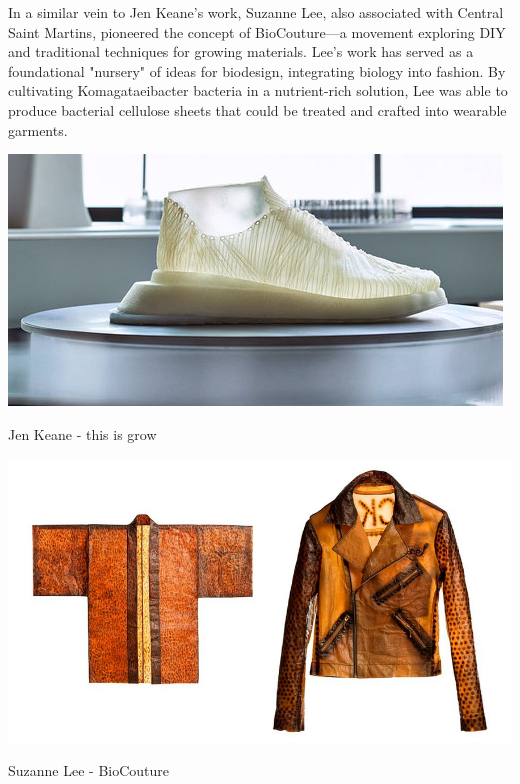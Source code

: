 In a similar vein to Jen Keane's work, Suzanne Lee, also associated with Central Saint Martins, pioneered the concept of BioCouture—a movement exploring DIY and traditional techniques for growing materials. Lee’s work has served as a foundational "nursery" of ideas for biodesign, integrating biology into fashion. By cultivating Komagataeibacter bacteria in a nutrient-rich solution, Lee was able to produce bacterial cellulose sheets that could be treated and crafted into wearable garments.

\begin{marginfigure}
    \centering
    \includegraphics{images/jen_keane.png}
    \caption{Jen Keane - this is grow}
    \label{fig:jen_keane}
\end{marginfigure}

\begin{marginfigure}
    \centering
    \includegraphics{images/suzanne_lee.png}
    \caption{Suzanne Lee - BioCouture}
    \label{fig:Suzanne Lee}
\end{marginfigure}


